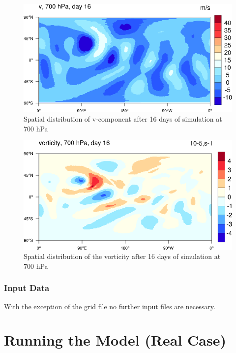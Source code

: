 \begin{figure}[h!]%
\centering
\includegraphics[width=0.95\linewidth]{pictures/v_day_16-small.png}
\caption{Spatial distribution of v-component after 16 days of simulation at 700 hPa}\label{fig:v-16}
\end{figure}


\begin{figure}[h!]%
\centering
\includegraphics[width=0.95\linewidth]{pictures/vorticity_16-o.png}
\caption{Spatial distribution of the vorticity after 16 days of simulation at 700 hPa}\label{fig:vorticity-16}
\end{figure}





\subsubsection{Input Data}

With the exception of the grid file no further input files are necessary. 





\section{Running the Model (Real Case)}
\label{chap:UG_running_model}


